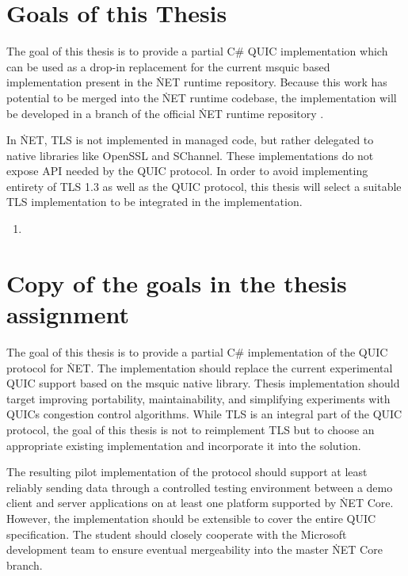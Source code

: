 \section{Goals of this Thesis}

The goal of this thesis is to provide a partial C\# QUIC implementation which can be used as a
drop-in replacement for the current msquic based implementation present in the \.NET runtime
repository. Because this work has potential to be merged into the \.NET runtime codebase, the
implementation will be developed in a branch of  the official \.NET runtime repository .

In \.NET, TLS is not implemented in managed code, but rather delegated to native libraries
like OpenSSL and SChannel. These implementations do not expose API needed by the QUIC protocol. In
order to avoid implementing entirety of TLS 1.3 as well as the QUIC protocol, this thesis will
select a suitable TLS implementation to be integrated in the implementation. 

\begin{enumerate}
  \item \textit{}
\end{enumerate}

\section*{Copy of the goals in the thesis assignment}


The goal of this thesis is to provide a partial C\# implementation of the QUIC protocol for \.NET. The
implementation should replace the current experimental QUIC support based on the msquic native
library. Thesis implementation should target improving portability, maintainability, and simplifying
experiments with QUICs congestion control algorithms. While TLS is an integral part of the QUIC
protocol, the goal of this thesis is not to reimplement TLS but to choose an appropriate existing
implementation and incorporate it into the solution.

The resulting pilot implementation of the protocol should support at least reliably sending data
through a controlled testing environment between a demo client and server applications on at least
one platform supported by \.NET Core. However, the implementation should be extensible to cover the
entire QUIC specification. The student should closely cooperate with the Microsoft development team
to ensure eventual mergeability into the master \.NET Core branch.
